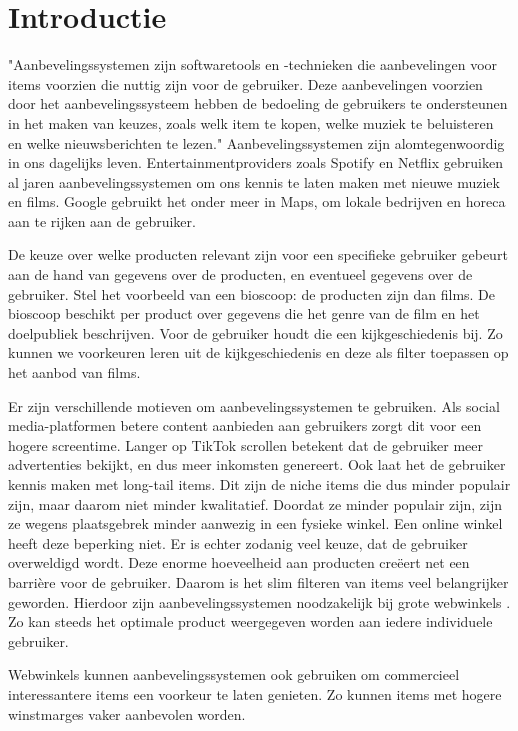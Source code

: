 \chapter{Introductie}

"Aanbevelingssystemen zijn softwaretools en -technieken die aanbevelingen voor items voorzien die nuttig zijn voor de gebruiker. Deze aanbevelingen voorzien door het aanbevelingssysteem hebben de bedoeling de gebruikers te ondersteunen in het maken van keuzes, zoals welk item te kopen, welke muziek te beluisteren en welke nieuwsberichten te lezen." \cite{recsys_handbook}
Aanbevelingssystemen zijn alomtegenwoordig in ons dagelijks leven. Entertainmentproviders zoals Spotify en Netflix gebruiken al jaren aanbevelingssystemen om ons kennis te laten maken met nieuwe muziek en films. Google gebruikt het onder meer in Maps, om lokale bedrijven en horeca aan te rijken aan de gebruiker.

De keuze over welke producten relevant zijn voor een specifieke gebruiker gebeurt aan de hand van gegevens over de producten, en eventueel gegevens over de gebruiker. Stel het voorbeeld van een bioscoop: de producten zijn dan films. De bioscoop beschikt per product over gegevens die het genre van de film en het doelpubliek beschrijven. Voor de gebruiker houdt die een kijkgeschiedenis bij. Zo kunnen we voorkeuren leren uit de kijkgeschiedenis en deze als filter toepassen op het aanbod van films.

Er zijn verschillende motieven om aanbevelingssystemen te gebruiken. Als social media-platformen betere content aanbieden aan gebruikers zorgt dit voor een hogere screentime. Langer op TikTok scrollen betekent dat de gebruiker meer advertenties bekijkt, en dus meer inkomsten genereert. \cite{tiktokalgorithm}
Ook laat het de gebruiker kennis maken met long-tail items. Dit zijn de niche items die dus minder populair zijn, maar daarom niet minder kwalitatief. Doordat ze minder populair zijn, zijn ze wegens plaatsgebrek minder aanwezig in een fysieke winkel. Een online winkel heeft deze beperking niet. Er is echter zodanig veel keuze, dat de gebruiker overweldigd wordt. Deze enorme hoeveelheid aan producten creëert net een barrière voor de gebruiker. \cite{paradox_choice} Daarom is het slim filteren van items veel belangrijker geworden. Hierdoor zijn aanbevelingssystemen noodzakelijk bij grote webwinkels \cite{rise_of_recsys_in_ecommerce}. Zo kan steeds het optimale product weergegeven worden aan iedere individuele gebruiker. \cite{cursus_hs2}

Webwinkels kunnen aanbevelingssystemen ook gebruiken om commercieel interessantere items een voorkeur te laten genieten. Zo kunnen items met hogere winstmarges vaker aanbevolen worden.

